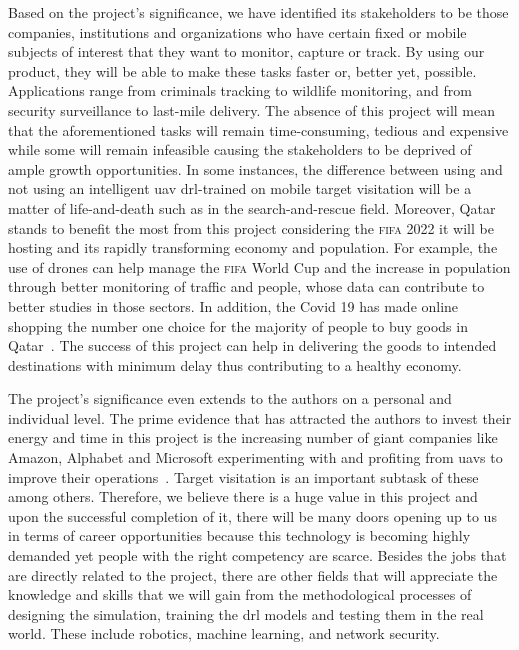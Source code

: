 \documentclass[../main.tex]{subfiles}
\begin{document}
Based on the project's significance, we have identified 
its stakeholders to be 
those companies, institutions and organizations who
have certain fixed or mobile subjects of interest 
that they want to monitor, capture or track.
By using our product,
they will be able to make these tasks faster or,
better yet, possible.
Applications range from criminals tracking 
to wildlife monitoring,
and from security surveillance
to last-mile delivery.
The absence of this project will mean that
the aforementioned tasks will remain
time-consuming, tedious and expensive
while some will remain infeasible
causing the stakeholders to be deprived of ample growth opportunities.
In some instances, the difference between using 
and not using an intelligent \gls{uav} 
\gls{drl}-trained on mobile target visitation
will be a matter of life-and-death
such as in the search-and-rescue field.
Moreover, Qatar stands to benefit the most from this project 
considering the \textsc{fifa} 2022 it will be hosting
and its rapidly transforming economy and population.
For example, the use of drones can help manage 
the \textsc{fifa} World Cup 
and the increase in population through better monitoring 
of traffic and people, whose data can contribute
to better studies in those sectors.
In addition, the Covid 19 has made online shopping
the number one choice for 
the majority of people to buy goods in Qatar~\cite{Has20}.
The success of this project can help in delivering
the goods to intended destinations with minimum delay
thus contributing to a healthy economy.

The project's significance even extends to the authors
on a personal and individual level.
The prime evidence that has attracted the authors to invest
their energy and time in this project is
the increasing number of giant companies like Amazon, Alphabet
and Microsoft experimenting with and profiting from \glspl{uav}
to improve their operations~\cite{Jun17}.
Target visitation is an important subtask of these among others.
Therefore, we believe there is a huge value
in this project and upon the successful completion of it,
there will be many doors opening up to us in terms of
career opportunities because 
this technology is becoming highly demanded yet 
people with the right competency
are scarce.
Besides the jobs that are directly related to the project,
there are other fields that will appreciate the knowledge
and skills that we will gain from the methodological processes 
of designing the simulation,
training the \gls{drl} models and testing them in the real world.
These include robotics, machine learning, and 
network security.
\end{document}
